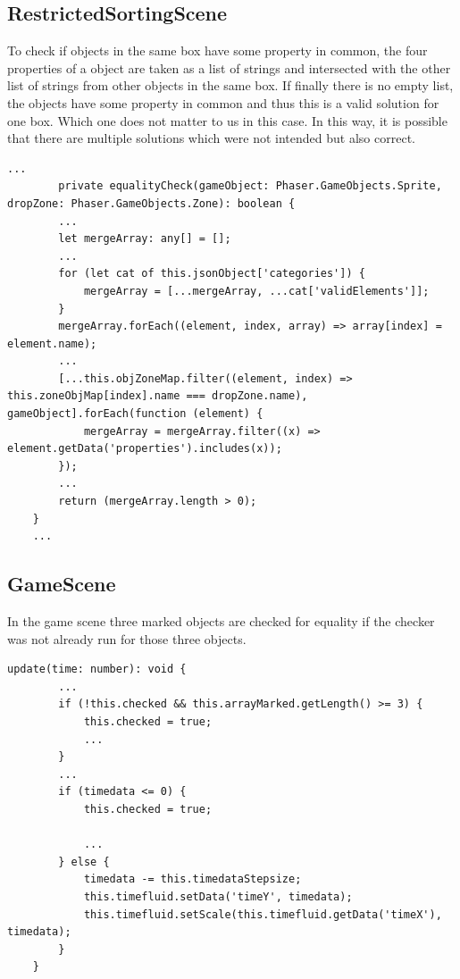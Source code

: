 \subsection{RestrictedSortingScene}\label{subsec:restrictedsortingscene}
To check if objects in the same box have some property in common,
the four properties of a object are taken as a list of strings and intersected with the other list of strings from other
objects in the same box.
If finally there is no empty list, the objects have some property in common and thus this is a valid solution for one box.
Which one does not matter to us in this case.
In this way, it is possible that there are multiple solutions which were not intended but also correct.

\begin{lstlisting}[style=TypeScript, caption={equalityCheck (restrictedSortingScene.ts)}]
    ...
        private equalityCheck(gameObject: Phaser.GameObjects.Sprite, dropZone: Phaser.GameObjects.Zone): boolean {
        ...
        let mergeArray: any[] = [];
        ...
        for (let cat of this.jsonObject['categories']) {
            mergeArray = [...mergeArray, ...cat['validElements']];
        }
        mergeArray.forEach((element, index, array) => array[index] = element.name);
        ...
        [...this.objZoneMap.filter((element, index) => this.zoneObjMap[index].name === dropZone.name), gameObject].forEach(function (element) {
            mergeArray = mergeArray.filter((x) => element.getData('properties').includes(x));
        });
        ...
        return (mergeArray.length > 0);
    }
    ...
\end{lstlisting}

\subsection{GameScene}\label{subsec:gamescene}
In the game scene three marked objects are checked for equality
if the checker was not already run for those three objects.

\begin{lstlisting}[style=TypeScript, caption={update (gameScene.ts)}]
    update(time: number): void {
        ...
        if (!this.checked && this.arrayMarked.getLength() >= 3) {
            this.checked = true;
            ...
        }
        ...
        if (timedata <= 0) {
            this.checked = true;

            ...
        } else {
            timedata -= this.timedataStepsize;
            this.timefluid.setData('timeY', timedata);
            this.timefluid.setScale(this.timefluid.getData('timeX'), timedata);
        }
    }
\end{lstlisting}


